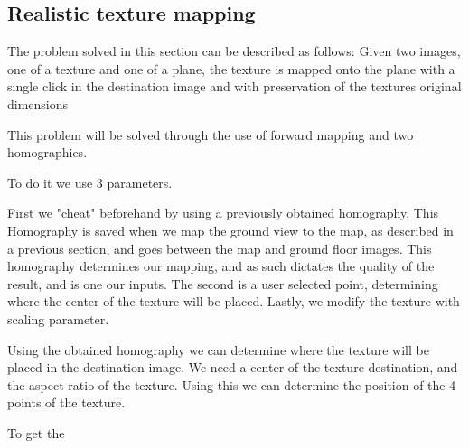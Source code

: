 \subsection{Realistic texture mapping}

The problem solved in this section can be described as follows:
\newline
Given two images, one of a texture and one of a plane, the texture is
mapped onto the plane with a single click in the destination image and with
preservation of the textures original dimensions

This problem will be solved through the use of forward mapping and two
homographies.

To do it we use 3 parameters.

First we "cheat" beforehand by using a previously obtained homography. This
Homography is saved when we map the ground view to the map, as described in
a previous section, and goes between the map and ground floor images. This homography determines our mapping, and as such
dictates the quality of the result, and is one our inputs.
The second is a user selected point, determining where the center of the
texture will be placed. Lastly, we modify the texture with scaling
parameter.

Using the obtained homography we can determine where the texture will be
placed in the destination image. We need a center of the texture
destination, and the aspect ratio of the texture. Using this we can
determine the position of the 4 points of the texture. 

To get the 

